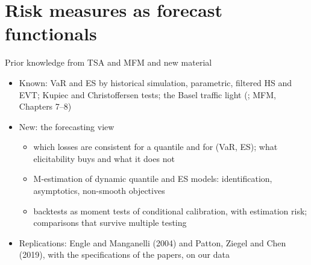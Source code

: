 \section{Risk measures as forecast functionals}

\begin{frame}{Prior knowledge from TSA and MFM and new material}
\itemsize{\small}
\begin{itemize}
    \item Known: VaR and ES by historical simulation, parametric, filtered HS and EVT; Kupiec and Christoffersen tests; the Basel traffic light (; MFM, Chapters 7--8)
    \item New: the forecasting view
    \begin{itemize}
        \item which losses are consistent for a quantile and for (VaR, ES); what elicitability buys and what it does not
        \item M-estimation of dynamic quantile and ES models: identification, asymptotics, non-smooth objectives
        \item backtests as moment tests of conditional calibration, with estimation risk; comparisons that survive multiple testing
    \end{itemize}
    \item Replications: Engle and Manganelli (2004) and Patton, Ziegel and Chen (2019), with the specifications of the papers, on our data
\end{itemize}
\end{frame}


